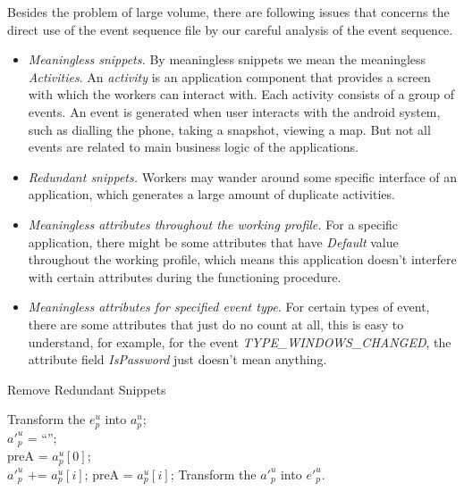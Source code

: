 \documentclass[10pt,conference]{IEEEtran}
\begin{document}
Besides the problem of large volume, there are following issues that concerns the direct use
of the event sequence file by our careful analysis of the event sequence.
\begin{itemize}
\item \emph{Meaningless snippets.} By meaningless snippets we mean the meaningless \emph{Activities}. An
\emph{activity} is an application component that provides a screen with which the workers can interact with. Each activity consists of a group of events.
An event is generated when user interacts with the android system, such as dialling the phone, taking a snapshot, viewing a map.
But not all events are related to main business logic of the applications.

\item \emph{Redundant snippets.} Workers may wander around some specific interface of an application, which
generates a large amount of duplicate activities.

\item \emph{Meaningless attributes throughout the working profile.} For a specific application, there might be some attributes
that have \emph{Default} value throughout the working profile, which means this application doesn't interfere with certain attributes
during the functioning procedure.

\item \emph{Meaningless attributes for specified event type.} For certain types of event, there are some attributes that just do
no count at all, this is easy to understand, for example, for the event \emph{TYPE\_WINDOWS\_CHANGED}, the attribute field
\emph{IsPassword} just doesn't mean anything.
\end{itemize}

\begin{algorithm}[!htbp]
\small
\caption{Remove Redundant Snippets}
\label{alg:redundant}
\BlankLine
\LinesNumbered
{}
Transform the $e^{u}_p$ into $a^{u}_p$;\\
$a'^{u}_p$ = ``'';\\
preA = $a^{u}_p[0]$;\\
 {
{$a'^{u}_p$ += $a^{u}_p[i]$;}
preA = $a^{u}_p[i]$;
}
Transform the $a'^{u}_p$ into $e'^{u}_p$.\\
\end{algorithm}
\end{document}

